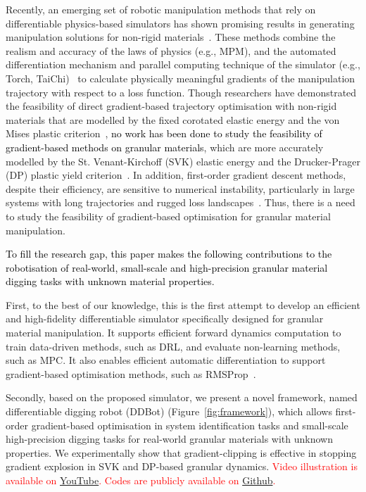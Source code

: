 \documentclass[letterpaper, 10 pt, journal, twoside]{ieeetran}
\newcommand{\rp}[1]{\textcolor{black}{#1}}
\newcommand{\rps}[1]{\textcolor{red}{#1}}
\begin{document}
Recently, an emerging set of robotic manipulation methods that rely on differentiable physics-based simulators has shown promising results in generating manipulation solutions for non-rigid materials~\cite{xu2021accelerated,chen2022diffsrl}. These methods combine the realism and accuracy of the laws of physics (e.g., MPM), and the automated differentiation mechanism and parallel computing technique of the simulator (e.g., Torch, TaiChi)~\cite{hu2019difftaichi,newbury2024review} to calculate physically meaningful gradients of the manipulation trajectory with respect to a loss function. Though researchers have demonstrated the feasibility of direct gradient-based trajectory optimisation with non-rigid materials that are modelled by the fixed corotated elastic energy and the von Mises plastic criterion~\cite{huang2021plasticinelab,xian2023fluidlab}, \rp{no work has been done to study the feasibility of gradient-based methods on granular materials}, which are more accurately modelled by the St. Venant-Kirchoff (SVK) elastic energy and the Drucker-Prager (DP) plastic yield criterion~\cite{klar2016drucker}. In addition, first-order gradient descent methods, despite their efficiency, are sensitive to numerical instability, particularly in large systems with long trajectories and rugged loss landscapes~\cite{wei2024automachef}. Thus, there is a need to study the feasibility of gradient-based optimisation for granular material manipulation.

\rp{To fill the research gap, this paper makes the following contributions to the robotisation of real-world, small-scale and high-precision granular material digging tasks with unknown material properties.}

First, to the best of our knowledge, this is the first attempt to develop an efficient and high-fidelity differentiable simulator specifically designed for granular material manipulation. It supports efficient forward dynamics computation to train data-driven methods, such as DRL, and evaluate non-learning methods, such as MPC. It also enables efficient automatic differentiation to support gradient-based optimisation methods, such as RMSProp~\cite{tieleman2012rmsprop}.

Secondly, based on the proposed simulator, we present a novel framework, named differentiable digging robot (DDBot) (Figure~\ref{fig:framework}), which allows first-order gradient-based optimisation in system identification tasks and small-scale high-precision digging tasks for real-world granular materials with unknown properties. We experimentally show that gradient-clipping is effective in stopping gradient explosion in SVK and DP-based granular dynamics. \rps{Video illustration is available on \href{https://www.youtube.com/watch?v=eoNx5V688H0}{YouTube}. Codes are publicly available on \href{https://github.com/IanYangChina/DDBot}{Github}.}
\end{document}
